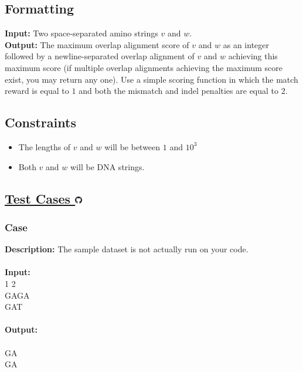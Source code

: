 \documentclass{article}
\newcommand{\code}[1]{{\fontfamily{pcr}\selectfont #1}}
\newcommand{\gitlogo}{\includegraphics[height=12.5]{c0/gitlogo.png}}
\begin{document}
\subsection*{Formatting}
\noindent\textbf{Input:} Two space-separated amino strings $v$ and $w$.\\
\noindent\textbf{Output:} The maximum overlap alignment score of $v$ and $w$ as an integer followed by a newline-separated overlap alignment of $v$ and $w$ achieving this maximum score (if multiple overlap alignments achieving the maximum score exist, you may return any one). Use a simple scoring function in which the match reward is equal to $1$ and both the mismatch and indel penalties are equal to $2$.

\subsection*{Constraints}
\begin{itemize}
    \item The lengths of $v$ and $w$ will be between $1$ and $10^3$
    \item Both $v$ and $w$ will be DNA strings.
\end{itemize}
\pagebreak

\subsection*{\href{https://github.com/rjeveloff/BA_problemregister/tree/main/test_cases/chapter_5/5I}{Test Cases \gitlogo}}
\subsubsection*{Case }
\hline \vspace{5}
\textbf{Description:} The sample dataset is not actually run on your code.\\ \\
\noindent \textbf{Input:}\\
\code{1 1 2\\GAGA\\GAT}\\ \\
\noindent \textbf{Output:}\\
\code{1\\GA\\GA}
\end{document}
